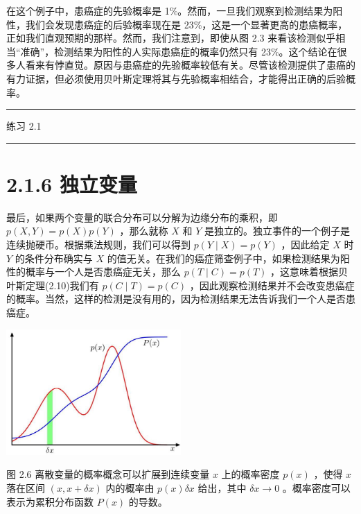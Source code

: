 \documentclass[10pt]{article}
\newcommand{\HRule}{\begin{center}\rule{0.9\linewidth}{0.2mm}\end{center}}
\begin{document}
在这个例子中，患癌症的先验概率是 1\%。然而，一旦我们观察到检测结果为阳性，我们会发现患癌症的后验概率现在是 23\%，这是一个显著更高的患癌概率，正如我们直观预期的那样。然而，我们注意到，即使从图 2.3 来看该检测似乎相当“准确”，检测结果为阳性的人实际患癌症的概率仍然只有 23\%。这个结论在很多人看来有悖直觉。原因与患癌症的先验概率较低有关。尽管该检测提供了患癌的有力证据，但必须使用贝叶斯定理将其与先验概率相结合，才能得出正确的后验概率。

\HRule

练习 2.1

\HRule

\section*{2.1.6 独立变量}

最后，如果两个变量的联合分布可以分解为边缘分布的乘积，即 \(p\left( {X,Y}\right)  = p\left( X\right) p\left( Y\right)\) ，那么就称 \(X\) 和 \(Y\) 是独立的。独立事件的一个例子是连续抛硬币。根据乘法规则，我们可以得到 \(p\left( {Y \mid  X}\right)  = p\left( Y\right)\) ，因此给定 \(X\) 时 \(Y\) 的条件分布确实与 \(X\) 的值无关。在我们的癌症筛查例子中，如果检测结果为阳性的概率与一个人是否患癌症无关，那么 \(p\left( {T \mid  C}\right)  = p\left( T\right)\) ，这意味着根据贝叶斯定理(2.10)我们有 \(p\left( {C \mid  T}\right)  = p\left( C\right)\) ，因此观察检测结果并不会改变患癌症的概率。当然，这样的检测是没有用的，因为检测结果无法告诉我们一个人是否患癌症。

\begin{center}
\includegraphics[max width=0.5\textwidth]{images/0194e279-9b28-703a-88f4-c3ac21e2010d_51_879_344_672_483_0.jpg}
\end{center}
\hspace*{3em} 

图 2.6 离散变量的概率概念可以扩展到连续变量 \(x\) 上的概率密度 \(p\left( x\right)\) ，使得 \(x\) 落在区间 \(\left( {x,x + {\delta x}}\right)\) 内的概率由 \(p\left( x\right) {\delta x}\) 给出，其中 \({\delta x} \rightarrow  0\) 。概率密度可以表示为累积分布函数 \(P\left( x\right)\) 的导数。
\end{document}
